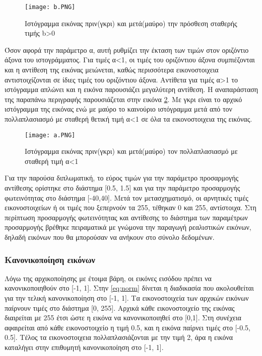 \begin{figure}[!h]
    \centering
      \texttt{[image: b.PNG]} \caption{Ιστόγραμμα εικόνας πριν(γκρι) και μετά(μαύρο) την πρόσθεση σταθερής τιμής b>0}
      \label{figure:b}    
  \end{figure}
  
Όσον αφορά την παράμετρο α, αυτή ρυθμίζει την έκταση  των τιμών στον οριζόντιο άξονα του ιστογράμματος. Για τιμές α<1, οι τιμές του οριζόντιου άξονα συμπιέζονται και η αντίθεση της εικόνας μειώνεται, καθώς περισσότερα εικονοστοιχεια αντιστοιχίζονται σε ίδιες τιμές του οριζόντιου άξονα. Αντίθετα για τιμές α>1 το ιστόγραμμα απλώνει και η εικόνα παρουσιάζει μεγαλύτερη αντίθεση. Η αναπαράσταση της παραπάνω περιγραφής παρουσιάζεται στην εικόνα \ref{figure:a}. Με γκρι είναι το αρχικό ιστόγραμμα της εικόνας ενώ με μαύρο το καινούριο ιστόγραμμα μετά από τον πολλαπλασιασμό με σταθερή θετική τιμή α<1 σε όλα τα εικονοστοιχεια της εικόνας.

\begin{figure}[!h]
    \centering
      \texttt{[image: a.PNG]} \caption{Ιστόγραμμα εικόνας πριν(γκρι) και μετά(μαύρο) τον πολλαπλασιασμό με σταθερή τιμή α<1}
      \label{figure:a}    
  \end{figure}


Για την παρούσα διπλωματική, το εύρος τιμών για την παράμετρο προσαρμογής  αντίθεσης ορίστηκε στο διάστημα [0.5, 1.5] και για την παράμετρο προσαρμογής φωτεινότητας στο διάστημα [-40,40]. Μετά τον μετασχηματισμό, οι  αρνητικές τιμές εικονοστοιχείων ή οι τιμές που ξεπερνούν τα 255, τέθηκαν 0 και 255, αντίστοιχα. Στη περίπτωση προσαρμογής φωτεινότητας και αντίθεσης το διάστημα των παραμέτρων προσαρμογής βρέθηκε πειραματικά με γνώμονα την παραγωγή ρεαλιστικών εικόνων, δηλαδή εικόνων που θα μπορούσαν να ανήκουν στο σύνολο δεδομένων. 

\subsubsection{Κανονικοποίηση εικόνων}
\label{subsubsec:5.1.2.4}

Λόγω της αρχικοποίησης με έτοιμα βάρη, οι εικόνες εισόδου πρέπει να κανονικοποιηθούν στο [-1, 1]. Στην \ref{eq:norm}  δίνεται η διαδικασία που ακολουθείται για την τελική κανονικοποίηση στο [-1, 1].  Τα εικονοστοιχεία των αρχικών εικόνων  παίρνουν τιμές στο διάστημα [0, 255]. Αρχικά κάθε εικονοστοιχείο της εικόνας διαιρείται με 255 έτσι ώστε η εικόνα να κανονικοποιηθεί στο [0,1]. Στη συνέχεια αφαιρείται από κάθε εικονοστοιχείο η τιμή 0.5, και η εικόνα παίρνει τιμές στο [-0.5, 0.5]. Τέλος τα εικονοστοιχεια πολλαπλασιάζονται με την τιμή 2, άρα η εικόνα καταλήγει στην επιθυμητή κανονικοποίηση στο [-1, 1].


